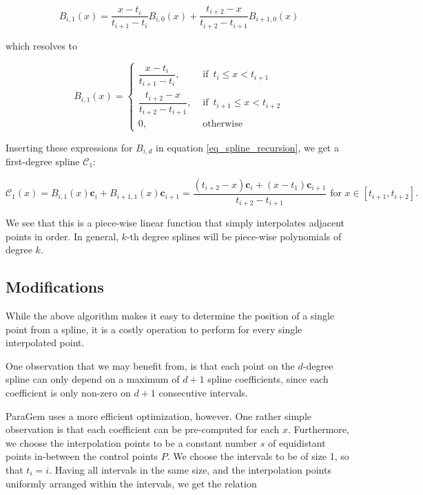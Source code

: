 \documentclass[english]{article}
\begin{document}
\[
B_{i,1}(x) = \dfrac{x - t_i}{t_{i + 1} - t_i}B_{i,0}(x) + \dfrac{t_{i + 2} - x}{t_{i + 2} - t_{i + 1}}B_{i + 1,0}(x)
\]

which resolves to

\[
B_{i,1}(x) =
\begin{cases}
  \dfrac{x - t_i}{t_{i + 1} - t_i},            &\text{ if } \, t_i \leq x < t_{i + 1} \\
  \dfrac{t_{i + 2} - x}{t_{i + 2} - t_{i + 1}}, &\text{ if } \, t_{i + 1} \leq x < t_{i + 2} \\
  0, &\text{ otherwise }
\end{cases}
\]

Inserting these expressions for $B_{i,d}$ in equation \ref{eq_spline_recursion}, we get a first-degree spline $\mathcal{C}_1$:

\[
\mathcal{C}_1(x) = B_{i,1}(x)\mathbf{c}_i + B_{i+1,1}(x)\mathbf{c}_{i + 1} = \dfrac{(t_{i + 2} - x)\mathbf{c}_i + (x - t_1)\mathbf{c}_{i + 1}}{t_{i + 2} - t_{i + 1}} \text{ for } x \in [t_{i + 1}, t_{i + 2}].
\]

We see that this is a piece-wise linear function that simply interpolates adjacent points in order. In general, $k$-th degree splines will be piece-wise polynomials of degree $k$.

\subsection{Modifications}

While the above algorithm makes it easy to determine the position of a single point from a spline, it is a costly operation to perform for every single interpolated point.

One observation that we may benefit from, is that each point on the $d$-degree spline can only depend on a maximum of $d + 1$ spline coefficients, since each coefficient is only non-zero on $d + 1$ consecutive intervals.

ParaGem uses a more efficient optimization, however. One rather simple observation is that each coefficient can be pre-computed for each $x$. Furthermore, we choose the interpolation points to be a constant number $s$ of equidistant points in-between the control points $P$. We choose the intervals to be of size 1, so that $t_i = i$. Having all intervals in the same size, and the interpolation points uniformly arranged within the intervals, we get the relation
\end{document}
